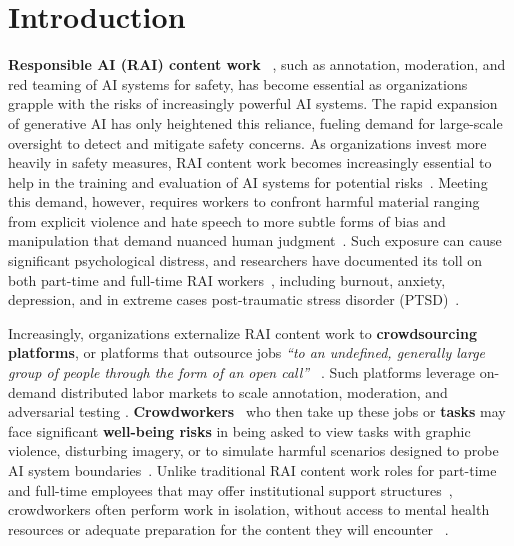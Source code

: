 \section{Introduction}



\textbf{Responsible AI (RAI) content work} ~\cite{qian2025aura}, such as annotation, moderation, and red teaming of AI systems for safety, has become essential as organizations grapple with the risks of increasingly powerful AI systems. The rapid expansion of generative AI has only heightened this reliance, fueling demand for large-scale oversight to detect and mitigate safety concerns\cite{StanfordHAI2025AIIndex, GrandViewResearch2024GenerativeAI}. As organizations invest more heavily in safety measures, RAI content work becomes increasingly essential to help in the training and evaluation of AI systems for potential risks~\cite{udupa2023ethical}. Meeting this demand, however, requires workers to confront harmful material ranging from explicit violence and hate speech to more subtle forms of bias and manipulation that demand nuanced human judgment~\cite{qian2025aura}. Such exposure can cause significant psychological distress, and researchers have documented its toll on both part-time and full-time RAI workers~\cite{roberts2016commercial, qian2025aura}, including burnout, anxiety, depression, and in extreme cases post-traumatic stress disorder (PTSD)~\cite{alemadi2024emotional, martinez2024secondary, spence2025content, gebrekidan2024content}.

Increasingly, organizations externalize RAI content work to \textbf{crowdsourcing platforms}, or platforms that outsource jobs \textit{``to an undefined, generally large group of people through the form of an open call''} ~\cite{howe2006rise, berg2018digital}. Such platforms leverage on-demand distributed labor markets to scale annotation, moderation, and adversarial testing \cite{udupa2023ethical, mann2025meta, egelman2014crowdsourcing}.
\textbf{Crowdworkers}~\cite{berg2018digital} who then take up these jobs or \textbf{tasks} may face significant \textbf{well-being risks} in being asked to view tasks with graphic violence, disturbing imagery, or to simulate harmful scenarios designed to probe AI system boundaries~\cite{qian2025locating}. 
Unlike traditional RAI content work roles for part-time and full-time employees that may offer institutional support structures~\cite{qian2025aura, roberts2016commercial, steiger_psychological_2021}, crowdworkers often perform work in isolation, without access to mental health resources or adequate preparation for the content they will encounter ~\cite{schlicher2021flexible, berastegui2021exposure}. 


